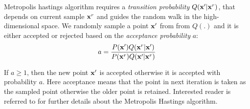 \documentclass[letterpaper, 10 pt, conference]{ieeeconf} %
\begin{document}

Metropolis hastings algorithm requires a \emph{transition probability} $Q(\mathbf{x}'|
\mathbf{x}^r)$, that depends on current sample $\mathbf{x}^r$ and guides
the random walk in the high-dimensional space. We randomly sample a point
$\mathbf{x}'$ from from $Q(.)$ and it is either accepted or rejected based on the
\emph{acceptance probability} $a$:
\begin{align}
  a = \frac{P(\mathbf{x}')Q(\mathbf{x}^r| \mathbf{x}')}
  {P(\mathbf{x}^r)Q(\mathbf{x}'| \mathbf{x}^r)}
\end{align}

If $a \ge 1$, then the new point $\mathbf{x}'$ is accepted otherwise it is accepted with probability $a$. Here acceptance means that the point in next iteration is taken as the sampled point otherwise the older point is retained.
Interested reader is referred to \cite{mackay1998introduction} for further details about the Metropolis Hastings algorithm.
\end{document}

